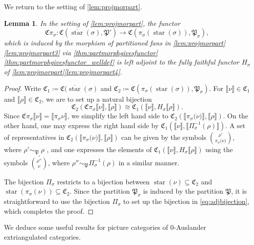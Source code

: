 \documentclass[10pt,twoside, a4paper,reqno]{amsart}
\DeclareMathOperator{\starr}{star}
\newcommand{\eqclass}[1]{ \llbracket #1 \rrbracket }
\newcommand{\catof}{\mathfrak{C}}
\newcommand{\Pfrak}{\mathfrak{P}}
\newtheorem{lemma}[theorem]{Lemma}
\theoremstyle{definition}
\begin{document}
{We return to the setting of \cref{lem:projmorpart}.}

\begin{lemma}\label{lem:projmoradj}
	In the setting of \cref{lem:projmorpart}, the functor 
	\[\catof \pi_{\sigma}: \catof(\overline{\starr}(\sigma), \Pfrak') \to \catof( \pi_{\sigma}(\starr (\sigma)), \Pfrak_\sigma), \]
	which is induced by the morphism of partitioned fans in \cref{lem:projmorpart}\eqref{lem:projmorpart3} via \cref{thm:partmorphgivesfunctor}\eqref{thm:partmorphgivesfunctor_welldef} is left adjoint to the fully faithful functor $H_{\sigma}$ of \cref{lem:projmorpart}\eqref{lem:projmorpart4}.
\end{lemma}
\begin{proof}
	Write $\catof_1 \coloneqq \catof(\overline{\starr}(\sigma)$ and $\catof_2 \coloneqq \catof( \pi_{\sigma}(\starr (\sigma)), \Pfrak_\sigma)$. For $\eqclass{\nu} \in \catof_1$ and $\eqclass{\rho} \in \catof_2$, we are to set up a natural bijection
\begin{equation}\label{eq:adjbijection}
    \catof_2(\catof \pi_{\sigma} \eqclass{{\nu}},\eqclass{\rho}) \cong
    \catof_1(\eqclass{{\nu}},H_{\sigma} \eqclass{\rho}).
\end{equation}
Since $\catof \pi_{\sigma} \eqclass{{\nu}} = \eqclass{{\pi_{
    \sigma}}{\nu}}$, we simplify the left hand side to $\catof_2(\eqclass{{\pi_{\sigma}}{(}{\nu}{)}},\eqclass{\rho})$. On the other hand, one may express the right hand side by $\catof_1(\eqclass{{\nu}},\eqclass{{\Pi_{\sigma}^{-1}}(\rho)})$. A set of representatives in $\catof_2(\eqclass{{\pi_{
    \sigma}}{(}{\nu}{)}},\eqclass{\rho})$ can be given by the symbols $\binom{\rho'}{\pi_{\sigma}{(}{\nu}{)}}$, where $\rho' \sim_{\Pfrak_{_\sigma}} \rho$ \cite[Cor. 3.6]{Kai23}, and one expresses the elements of $\catof_1(\eqclass{{\nu}},H_{\sigma}\eqclass{\rho})$ {using the symbols $\binom{\rho''}{\nu}$, where $\rho'' \sim_{\Pfrak} \Pi_{\sigma}^{-1} (\rho) $} in a similar manner. 
    
    The bijection $\Pi_{\sigma}$ restricts to a bijection between $\starr(\nu) \subseteq \catof_2$ and $\starr(\pi_{\sigma}(\nu)) \subseteq \catof_2$. Since the partition $\Pfrak_{\sigma}$ {is induced by} the partition $\Pfrak$, it is straightforward to use the bijection $\Pi_{\sigma}$ to set up the bijection in \eqref{eq:adjbijection}, which completes the proof. 
\end{proof}


We deduce some useful results for picture categories of 0-Auslander extriangulated categories.
\end{document}
